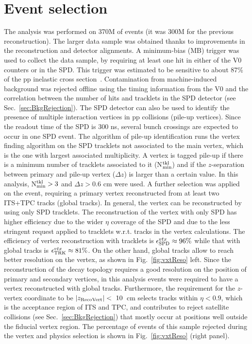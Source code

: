 \section{Event selection}
\label{sec:EvSelec}
The analysis was performed on 370M of events (it was 300M for the previous
reconstruction). The larger data sample was obtained thanks to improvements in the reconstruction
and detector alignments.
 A minimum-bias (MB)
trigger was used to collect the data sample, by requiring
at least one hit in either of the V0 counters or in the SPD.
This trigger was estimated to be sensitive to about 87\% of the pp inelastic
cross section~\cite{Gagliardi:2011he}. 
 Contamination from machine-induced background was rejected 
 offline using the timing information from the V0 and the correlation 
 between the number of hits and tracklets in the SPD
detector (see Sec.~\ref{sec:BkgRejection}).
 The SPD detector can also be used to identify the presence of multiple interaction
vertices in pp collisions (pile-up vertices). Since the readout time of the SPD is
300 ns, several bunch crossings are expected to occur in one SPD event.
The algorithm of pile-up identification runs the vertex finding algorithm 
on the SPD tracklets not associated to the
main vertex, which is the one with largest associated multiplicity. 
A vertex is tagged pile-up if there is a minimum number of 
tracklets associated to it (N$^{\rm tkl}_{\rm min}$) and if the 
$z$-separation between primary and pile-up vertex ($\Delta z$) is larger than a certain value.
In this analysis, N$^{\rm tkl}_{\rm min}>3$ and $\Delta z>0.6$ cm were used.
A further selection was applied on the event, requiring a primary vertex 
reconstructed from at least two ITS+TPC tracks (global tracks). In general, the vertex can be reconstructed by
using only SPD tracklets. The reconstruction of the vertex 
with only SPD has higher efficiency due to the wider $\eta$
coverage of the SPD and due to the less stringent request applied to tracklets w.r.t. tracks in
the vertex calculations. The efficiency of vertex reconstruction with 
tracklets is $\epsilon^{vtx}_{\rm SPD} \approx 96\%$ while that with global tracks
is $\epsilon^{vtx}_{\rm TRK} \approx 81\%$. On the other hand, global tracks
allow to reach better resolution on the vertex, as shown in Fig.~\ref{fig:vxtReso} left.
Since the reconstruction of the decay topology 
requires a good resolution on the position of primary and secondary vertices,
in this analysis events were required to have a vertex reconstructed with global tracks.
Furthermore, the requirement for the $z$-vertex coordinate to be $|z_{\rm RecoVert}|<~10$~cm 
selects tracks within $\eta < 0.9$, which is the acceptance region of ITS and TPC,
and contributes to reject satellite collisions (see Sec.~\ref{sec:BkgRejection}) 
that mostly occur at positions well outside the fiducial vertex region. 
The percentage of events of this sample rejected during the vertex and physics selection
is shown in Fig.~\ref{fig:vxtReso} (right panel). 

